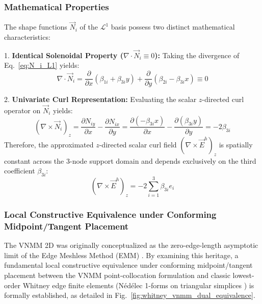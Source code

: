 \documentclass[preprint,12pt]{elsarticle}
\begin{document}
\subsubsection{Mathematical Properties}
The shape functions $\vec{N}_i$ of the $\mathcal{L}^1$ basis possess two distinct mathematical characteristics:

1. \textbf{Identical Solenoidal Property ($\nabla \cdot \vec{N}_i \equiv 0$):} Taking the divergence of Eq.~\eqref{eq:N_i_L1} yields:
\begin{equation}
    \nabla \cdot \vec{N}_i = \frac{\partial}{\partial x}(\beta_{1i} + \beta_{3i} y) + \frac{\partial}{\partial y}(\beta_{2i} - \beta_{3i} x) \equiv 0
\end{equation}

2. \textbf{Univariate Curl Representation:} Evaluating the scalar $z$-directed curl operator on $\vec{N}_i$ yields:
\begin{equation}
    (\nabla \times \vec{N}_i)_z = \frac{\partial N_{iy}}{\partial x} - \frac{\partial N_{ix}}{\partial y} = \frac{\partial (-\beta_{3i} x)}{\partial x} - \frac{\partial (\beta_{3i} y)}{\partial y} = -2\beta_{3i}
\end{equation}
Therefore, the approximated $z$-directed scalar curl field $(\nabla \times \vec{E}^h)_z$ is spatially constant across the 3-node support domain and depends exclusively on the third coefficient $\beta_{3i}$:
\begin{equation}
    (\nabla \times \vec{E}^h)_z = -2 \sum_{i=1}^3 \beta_{3i} e_i
\end{equation}

\subsubsection{Local Constructive Equivalence under Conforming Midpoint/Tangent Placement}
\label{subsubsec:dual_whitney}
The VNMM 2D was originally conceptualized as the zero-edge-length asymptotic limit of the Edge Meshless Method (EMM) \cite{lima2017edge, ortiz2021nodal}. By examining this heritage, a fundamental local constructive equivalence under conforming midpoint/tangent placement between the VNMM point-collocation formulation and classic lowest-order Whitney edge finite elements (N\'ed\'elec 1-forms on triangular simplices \cite{nedelec1980mixed, monk2003finite, boffi2013mixed}) is formally established, as detailed in Fig.~\ref{fig:whitney_vnmm_dual_equivalence}.
\end{document}
